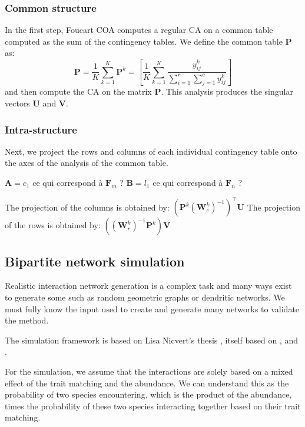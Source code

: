 \subsubsection{Common structure}

In the first step, Foucart COA computes a regular CA on a common table computed as the sum of the contingency tables. We define the common table $\mathbf{P}$ as:
$$
    \mathbf{P} = \frac{1}{K} \sum_{k=1}^K \mathbf{P}^k = \left[ \frac{1}{K}\sum_{k=1}^{K}\frac{y_{ij}^k}{\sum_{i=1}^{r} \sum_{j=1}^{c} y_{ij}^k} \right]
$$
and then compute the CA on the matrix $\mathbf{P}$. This analysis produces the singular vectors $\mathbf{U}$ and $\mathbf{V}$.

\subsubsection{Intra-structure}

Next, we project the rows and columns of each individual contingency table onto the axes of the analysis of the common table.

$\mathbf{A} = c_1$ ce qui correspond à $\mathbf{F}_m$ ?
$\mathbf{B} = l_1$ ce qui correspond à $\mathbf{F}_n$ ?

The  projection of the columns is obtained by: $\left( \mathbf{P}^k (\mathbf{W}_c^k)^{-1} \right)^\intercal\mathbf{U}$
The projection of the rows is obtained by: $\left( (\mathbf{W}_r^k)^{-1}\mathbf{P}^k \right) \mathbf{V}$


\subsection{Bipartite network simulation}

Realistic interaction network generation is a complex task and many ways exist to generate some such as random geometric graphs or dendritic networks. We must fully know the input used to create and generate many networks to validate the method.

The simulation framework is based on Lisa Nicvert's thesis \citep{these_lisa_2024}, itself based on \cite{frund_sampling_2016}, \cite{benadi_quantitative_2022} and \cite{dray_testing_2008}.

For the simulation, we assume that the interactions are solely based on a mixed effect of the trait matching and the abundance. We can understand this as the probability of two species encountering, which is the product of the abundance, times the probability of these two species interacting together based on their trait matching.


